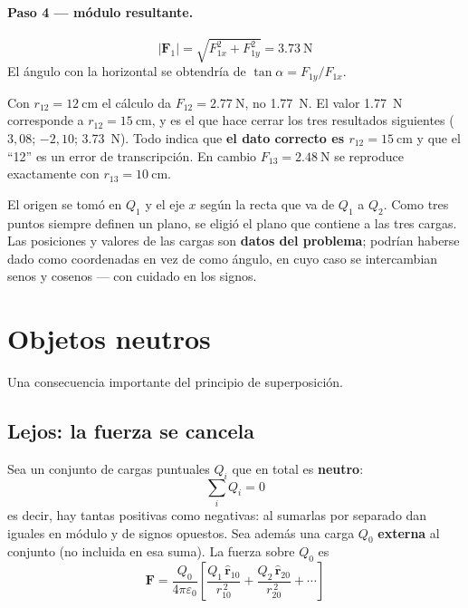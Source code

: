 \documentclass[12pt,a4paper]{article}
\begin{document}
\paragraph{Paso 4 --- módulo resultante.}
\[
|\mathbf{F}_1| = \sqrt{F_{1x}^2 + F_{1y}^2} = \SI{3.73}{\newton}
\]
El ángulo con la horizontal se obtendría de $\tan\alpha = F_{1y}/F_{1x}$.



\begin{warnbox}
Con $r_{12} = \SI{12}{\centi\metre}$ el cálculo da $F_{12} = \SI{2.77}{\newton}$,
no \SI{1.77}{\newton}. El valor \SI{1.77}{\newton} corresponde a
$r_{12} = \SI{15}{\centi\metre}$, y es el que hace cerrar los tres resultados
siguientes ($3{,}08$; $-2{,}10$; \SI{3.73}{\newton}). Todo indica que \textbf{el
dato correcto es $r_{12} = \SI{15}{\centi\metre}$} y que el \enquote{12} es un
error de transcripción. En cambio $F_{13} = \SI{2.48}{\newton}$ se reproduce
exactamente con $r_{13} = \SI{10}{\centi\metre}$.
\end{warnbox}

\begin{notebox}
El origen se tomó en $Q_1$ y el eje $x$ según la recta que va de $Q_1$ a $Q_2$.
Como tres puntos siempre definen un plano, se eligió el plano que contiene a las
tres cargas. Las posiciones y valores de las cargas son \textbf{datos del
problema}; podrían haberse dado como coordenadas en vez de como ángulo, en cuyo
caso se intercambian senos y cosenos --- con cuidado en los signos.
\end{notebox}

\section{Objetos neutros}

Una consecuencia importante del principio de superposición.

\subsection{Lejos: la fuerza se cancela}

Sea un conjunto de cargas puntuales $Q_i$ que en total es \textbf{neutro}:
\[
\sum_i Q_i = 0
\]
es decir, hay tantas positivas como negativas: al sumarlas por separado dan
iguales en módulo y de signos opuestos. Sea además una carga $Q_0$
\textbf{externa} al conjunto (no incluida en esa suma). La fuerza sobre $Q_0$ es
\[
\mathbf{F} = \frac{Q_0}{4\pi\varepsilon_0}\left[
\frac{Q_1\,\hat{\mathbf{r}}_{10}}{r_{10}^{\,2}}
+ \frac{Q_2\,\hat{\mathbf{r}}_{20}}{r_{20}^{\,2}} + \cdots \right]
\]
\end{document}
